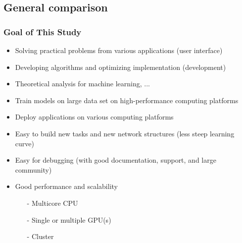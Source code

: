 \subsection{General comparison}


\begin{frame}
  \MyLogo
  \frametitle{Goal of This Study}  
\small

\medskip
{}
\begin{itemize}
\item Solving practical problems from various applications (user interface)
\item Developing algorithms and optimizing implementation (development)
\item Theoretical analysis for machine learning, ...
\end{itemize}

\begin{itemize}
\item Train models on large data set on high-performance computing platforms
\item Deploy applications on various computing platforms
\end{itemize}

\begin{itemize}
\item Easy to build new tasks and new network structures (less steep learning curve)
\item Easy for debugging (with good documentation, support, and large community)
\item Good performance and scalability
	\begin{itemize}
	\item[-] Multicore CPU
	\item[-] Single or multiple GPU(s)
	\item[-] Cluster
	\end{itemize}
\end{itemize}

\end{frame}


